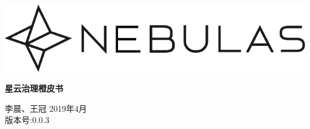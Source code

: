 \documentclass[12pt]{article}
\begin{document}
\pagestyle{empty}
\renewcommand{\contentsname}{目录}
\renewcommand{\abstractname}{摘要}
\renewcommand{\refname}{参考文献}
\renewcommand{\figurename}{图}
\renewcommand{\tablename}{表}
\renewcommand{\baselinestretch}{1.5}
\renewcommand{\appendixname}{附录}
\renewcommand{\proofname}{证明}

\pagecolor{\pcolor}

\begin{titlepage}
  \begin{center}
    \vspace*{5.5cm}
    \includegraphics[scale=0.5]{../common/Nebulas.png}
    \vspace{0.5cm}


    \textbf{\huge{星云治理橙皮书}}

    \vspace{0.5cm}
    李晨、王冠
    \vfill
    2019年4月 \\
    版本号:0.0.3
    \textbf{}
  \end{center}

\end{titlepage}
\setcounter{page}{0}
\tableofcontents
\newpage
\setcounter{page}{1}
\pagestyle{fancy}	
\vspace*{0.01cm}






\newpage


\newpage 
\begin{appendices}
%
\end{appendices}
\end{document}
